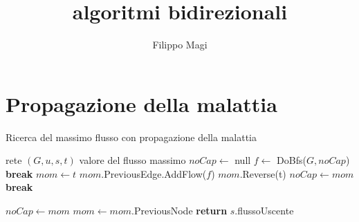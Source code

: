 \documentclass{article}
\title{algoritmi bidirezionali}
\author{Filippo Magi }
\begin{document}
\section{Propagazione della malattia}
\begin{algorithm}
\caption{Ricerca del massimo flusso con propagazione della malattia}
\begin{algorithmic}
\REQUIRE rete $(G,u,s,t)$
\ENSURE valore del flusso massimo
\STATE $noCap \leftarrow$ null
\STATE $f \leftarrow$ DoBfs($G,noCap$)
\STATE \textbf{break}
\ENDIF
\STATE $mom \leftarrow t$
\STATE $mom.$PreviousEdge.AddFlow($f$)
\STATE $mom$.Reverse(t) 
\STATE $noCap \leftarrow mom$
\STATE \textbf{break}
\ENDIF

\STATE $noCap \leftarrow mom$
\ENDIF
\STATE $mom \leftarrow mom.$PreviousNode
\ENDWHILE
\ENDWHILE
\STATE \textbf{return} $s.$flussoUscente
\end{algorithmic}
\end{algorithm}
\end{document}
